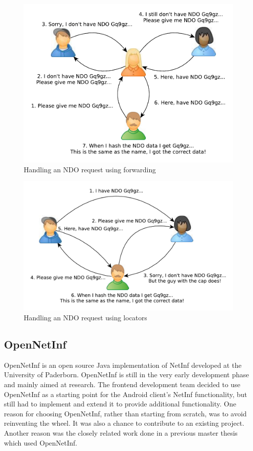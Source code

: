 \begin{figure}[H]
	\centering
		\includegraphics[width=1.00\textwidth, angle=0]{./img/netinf2.pdf}
    	\caption{Handling an NDO request using forwarding}
	\label{fig:ndorequest1}
\end{figure}

\begin{figure}[H]
	\centering
		\includegraphics[width=1.00\textwidth, angle=0]{./img/netinf1.pdf}
    	\caption{Handling an NDO request using locators}
	\label{fig:ndorequest2}
\end{figure}

\subsection{OpenNetInf}
OpenNetInf \cite{opennetinf} is an open source Java implementation of NetInf
 developed at the University of Paderborn. OpenNetInf is still in the very
 early development phase and mainly aimed at research. The frontend development
 team decided to use OpenNetInf as a starting point for the Android client's
 NetInf functionality, but still had to implement and extend it to provide additional functionality. One reason for choosing OpenNetInf, rather than 
starting from scratch, was to avoid reinventing the wheel. It was also a 
chance to contribute to an existing project. Another reason was the closely
 related work done in a previous master thesis \cite{hugomiguel} which used 
OpenNetInf.
